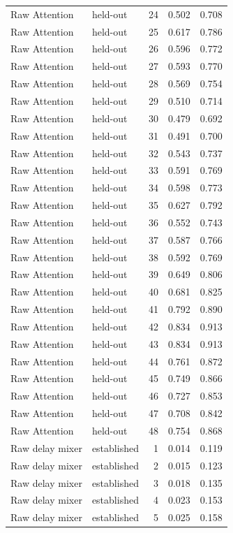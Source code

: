 \begin{tabular}{llrrr}
Raw Attention & held-out & 24 & 0.502 & 0.708 \\
Raw Attention & held-out & 25 & 0.617 & 0.786 \\
Raw Attention & held-out & 26 & 0.596 & 0.772 \\
Raw Attention & held-out & 27 & 0.593 & 0.770 \\
Raw Attention & held-out & 28 & 0.569 & 0.754 \\
Raw Attention & held-out & 29 & 0.510 & 0.714 \\
Raw Attention & held-out & 30 & 0.479 & 0.692 \\
Raw Attention & held-out & 31 & 0.491 & 0.700 \\
Raw Attention & held-out & 32 & 0.543 & 0.737 \\
Raw Attention & held-out & 33 & 0.591 & 0.769 \\
Raw Attention & held-out & 34 & 0.598 & 0.773 \\
Raw Attention & held-out & 35 & 0.627 & 0.792 \\
Raw Attention & held-out & 36 & 0.552 & 0.743 \\
Raw Attention & held-out & 37 & 0.587 & 0.766 \\
Raw Attention & held-out & 38 & 0.592 & 0.769 \\
Raw Attention & held-out & 39 & 0.649 & 0.806 \\
Raw Attention & held-out & 40 & 0.681 & 0.825 \\
Raw Attention & held-out & 41 & 0.792 & 0.890 \\
Raw Attention & held-out & 42 & 0.834 & 0.913 \\
Raw Attention & held-out & 43 & 0.834 & 0.913 \\
Raw Attention & held-out & 44 & 0.761 & 0.872 \\
Raw Attention & held-out & 45 & 0.749 & 0.866 \\
Raw Attention & held-out & 46 & 0.727 & 0.853 \\
Raw Attention & held-out & 47 & 0.708 & 0.842 \\
Raw Attention & held-out & 48 & 0.754 & 0.868 \\
Raw delay mixer & established & 1 & 0.014 & 0.119 \\
Raw delay mixer & established & 2 & 0.015 & 0.123 \\
Raw delay mixer & established & 3 & 0.018 & 0.135 \\
Raw delay mixer & established & 4 & 0.023 & 0.153 \\
Raw delay mixer & established & 5 & 0.025 & 0.158 \\

\end{tabular}

